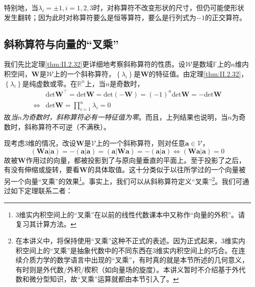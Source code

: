 \documentclass[main.tex]{subfiles}
\begin{document}
特别地，当$\lambda_i=\pm 1,i=1,2,3$时，对称算符不改变形状的尺寸，但仍可能使形状发生翻转；因为此时对称算符要么是恒等算符，要么是行列式为$-1$的正交算符。

\subsection{斜称算符与向量的“叉乘”}\label{sec:II.3.3.3}
我们先比定理\ref{thm:II.2.32}更详细地考察斜称算符的性质。设$\mathcal{W}$是数域$\mathbb{F}$上的$n$维内积空间，$\mathbf{W}$是$\mathcal{W}$上的一个斜称算符，$\left\{\lambda_i\right\}$是$\mathbf{W}$的特征值。由定理\ref{thm:II.2.32}，$\left\{\lambda_i\right\}$是纯虚数或零。在$\mathbb{R}^n$上，当$n$是奇数时，
\begin{align*}
                    & \mathrm{det}\mathbf{W}^\intercal=\mathrm{det}\mathbf{W}=\mathrm{det}\left(-\mathbf{W}\right)=\left(-1\right)^n\mathrm{det}\mathbf{W}=-\mathrm{det}\mathbf{W} \\
    \Leftrightarrow & \mathrm{det}\mathbf{W}=\prod_{i=1}^n\lambda_i=0
\end{align*}
故\emph{当$n$为奇数时，斜称算符必有一特征值为零}。而且，上列结果也说明，当$n$为奇数时，斜称算符不可逆（不满秩）。

现考虑3维的情况，改设$\mathbf{W}$是$\mathcal{V}$上的一个斜称算符，则对任意$\mathbf{a}\in\mathcal{V}$，
\[\left(\mathbf{Wa}|\mathbf{a}\right)=-\left(\mathbf{a}|\mathbf{a}\right)=\left(\mathbf{a}|\mathbf{Wa}\right)=-\left(\mathbf{a}|\mathbf{a}\right)\Leftrightarrow\left(\mathbf{Wa}|\mathbf{a}\right)=0\]
故被$\mathbf{W}$作用过的向量，都被投影到了与原向量垂直的平面上。至于投影了之后，有没有伸缩或旋转，要看$\mathbf{W}$的具体取值。这十分类似于以往所学过的一个向量被另一个向量“叉乘”的效果\footnote{3维实内积空间上的“叉乘”在以前的线性代数课本中又称作“向量的外积”\cite[\S3.2]{周胜林2012线性代数}。请复习其计算方法。}。事实上，我们可以从斜称算符定义“叉乘”\footnote{在本讲义中，将保持使用“叉乘”这种不正式的表述。因为正式起来，3维实内积空间上的“叉乘”是抽象代数中的不同东西在3维实内积空间上的巧合。在连续介质力学的数学语言中出现的“叉乘”，有时真的就是本节所述的几何意义，有时则是外代数/外积/楔积（如向量场的旋度）。本讲义暂时不介绍基于外代数和微分型知识，故“叉乘”运算就都由本节引入了。}。我们可通过如下定理联系二者：
\end{document}
